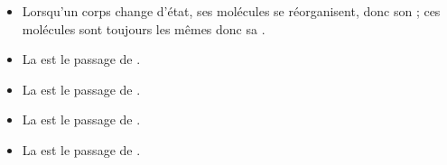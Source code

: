 \begin{mybilan}
	\begin{itemize}
		\item Lorsqu'un corps change d'état, ses molécules se réorganisent, donc son ; ces molécules sont toujours les mêmes donc sa .
		\item La  est le passage de .
		\item La  est le passage de .
		\item La  est le passage de .
		\item La  est le passage de .
		
	\end{itemize}


\end{mybilan}